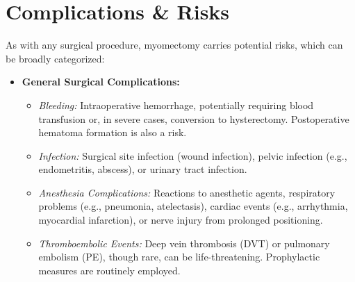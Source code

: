 \section*{Complications \& Risks}
As with any surgical procedure, myomectomy carries potential risks, which can be broadly categorized:

\begin{itemize}
  \item \textbf{General Surgical Complications:}
    \begin{itemize}
      \item \textit{Bleeding:} Intraoperative hemorrhage, potentially requiring blood transfusion or, in severe cases, conversion to hysterectomy. Postoperative hematoma formation is also a risk.
      \item \textit{Infection:} Surgical site infection (wound infection), pelvic infection (e.g., endometritis, abscess), or urinary tract infection.
      \item \textit{Anesthesia Complications:} Reactions to anesthetic agents, respiratory problems (e.g., pneumonia, atelectasis), cardiac events (e.g., arrhythmia, myocardial infarction), or nerve injury from prolonged positioning.
      \item \textit{Thromboembolic Events:} Deep vein thrombosis (DVT) or pulmonary embolism (PE), though rare, can be life-threatening. Prophylactic measures are routinely employed.
    \end{itemize}
  

\end{itemize}
